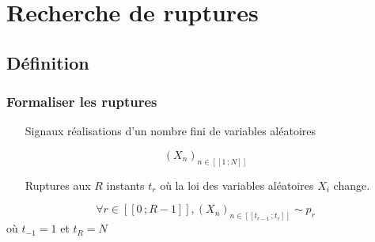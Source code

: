 \documentclass{beamer}
\begin{document}

\section{Recherche de ruptures}

\subsection{Définition}

\begin{frame}

\frametitle{Formaliser les ruptures}

\begin{itemize}
	\item[Signaux] réalisations d'un nombre fini de variables aléatoires
\end{itemize}

\vspace{-.4cm}
\[ (X_n)_{n \in [\![ 1\,; N ]\!] } \]
\phantom{caca}
	
\begin{itemize}
	\item[Ruptures]aux $R$ instants $t_r$ où la loi des variables aléatoires $X_i$ change.
\end{itemize}

\vspace{-.4cm}
\[ \forall r \in [\![0\,;R-1]\!] , (X_n)_{n\in[\![t_{r-1}\,;t_r]\!]} \sim p_r\]
\hspace{.7cm}
où $t_{-1}=1$ et $t_R=N$



\end{frame}
\end{document}
\end{frame}
\end{document}

